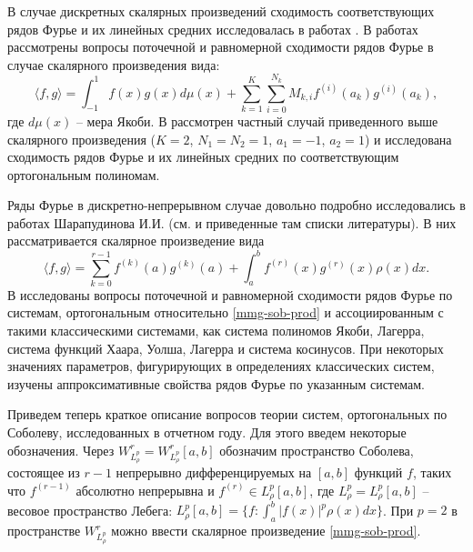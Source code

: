 В случае дискретных скалярных произведений сходимость соответствующих рядов Фурье и их линейных средних исследовалась в работах \cite{mmg-Marcellan2002,mmg-Rocha2003,mmg-OsilenkerFourier2012,mmg-OsilenkerLinearMethods2015,mmg-OsilenkerFourier2022,mmg-Fejzullahu2009,mmg-CiaurriSigma2018}. В работах \cite{mmg-Marcellan2002,mmg-Rocha2003} рассмотрены вопросы поточечной и равномерной сходимости рядов Фурье в случае скалярного произведения вида:
\begin{equation*}
	\langle f,g \rangle = \int_{-1}^{1}f(x)g(x)d\mu(x)+
	\sum_{k=1}^K\sum_{i=0}^{N_k} M_{k,i}f^{(i)}(a_k)g^{(i)}(a_k),
\end{equation*}
где $d\mu(x)$ -- мера Якоби. В \cite{mmg-OsilenkerFourier2012,mmg-OsilenkerLinearMethods2015,mmg-Fejzullahu2009,mmg-CiaurriSigma2018} рассмотрен частный случай приведенного выше скалярного произведения ($K=2$, $N_1=N_2=1$, $a_1=-1$, $a_2=1$) и исследована сходимость рядов Фурье и их линейных средних по соответствующим ортогональным полиномам.

Ряды Фурье в дискретно-непрерывном случае довольно подробно исследовались в работах Шарапудинова И.И. (см. \cite{mmg-SharapudinovUMN,mmg-SharapudinovIzvRan2019} и приведенные там списки литературы). В них рассматривается скалярное произведение вида
\begin{equation}\label{mmg-sob-prod}
	\langle f, g \rangle = \sum_{k=0}^{r-1}f^{(k)}(a)g^{(k)}(a)+\int_a^b f^{(r)}(x)g^{(r)}(x)\rho(x)dx.
\end{equation}
В \cite{mmg-SharapudinovUMN,mmg-SharapudinovIzvRan2019,mmg-MMG2019,mmg-Gadzhimirzaev2019} исследованы вопросы поточечной и равномерной сходимости рядов Фурье по системам, ортогональным относительно \eqref{mmg-sob-prod} и ассоциированным с такими классическими системами, как система полиномов Якоби, Лагерра, система функций Хаара, Уолша, Лагерра и система косинусов. При некоторых значениях параметров, фигурирующих в определениях классических систем, изучены аппроксимативные свойства рядов Фурье по указанным системам.

Приведем теперь краткое описание вопросов теории систем, ортогональных по Соболеву, исследованных в отчетном году. Для этого введем некоторые обозначения.
Через $W^r_{L^p_\rho}=W^r_{L^p_\rho}[a,b]$ обозначим пространство Соболева, состоящее из $r-1$ непрерывно дифференцируемых на $[a,b]$ функций $f$, таких что $f^{(r-1)}$ абсолютно непрерывна и $f^{(r)} \in L^p_\rho[a,b]$, где $L^p_\rho=L^p_\rho[a,b]$ -- весовое пространство Лебега: $L^p_\rho[a,b] = \{ f: \int_a^b |f(x)|^p\rho(x)dx \}$. При $p=2$ в пространстве $W^r_{L^p_\rho}$ можно ввести скалярное произведение \ref{mmg-sob-prod}.

